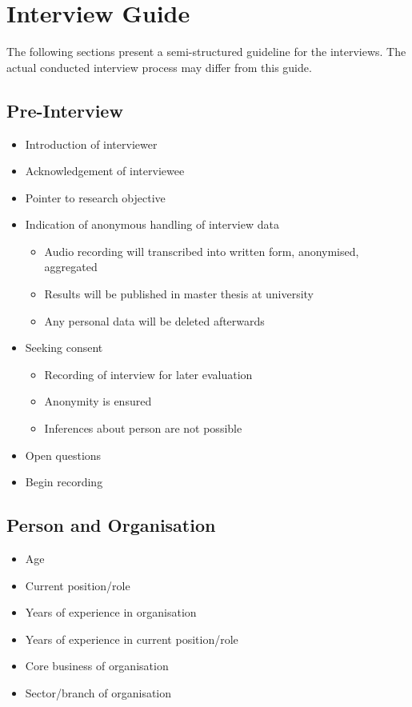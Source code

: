 \chapter{Interview Guide}\label{appendix:interview-guide}

The following sections present a semi-structured guideline for the interviews.
The actual conducted interview process may differ from this guide.

\section{Pre-Interview}

\begin{itemize}
	\item Introduction of interviewer
	\item Acknowledgement of interviewee
	\item Pointer to research objective
	\item Indication of anonymous handling of interview data
	\begin{itemize}
		\item Audio recording will transcribed into written form, anonymised, aggregated
		\item Results will be published in master thesis at university
		\item Any personal data will be deleted afterwards
	\end{itemize}
	\item Seeking consent
	\begin{itemize}
		\item Recording of interview for later evaluation
		\item Anonymity is ensured
		\item Inferences about person are not possible
	\end{itemize}
	\item Open questions
	\item Begin recording
\end{itemize}

\section{Person and Organisation}

\begin{itemize}
	\item Age
	\item Current position/role
	\item Years of experience in organisation
	\item Years of experience in current position/role
	\item Core business of organisation
	\item Sector/branch of organisation
\end{itemize}


